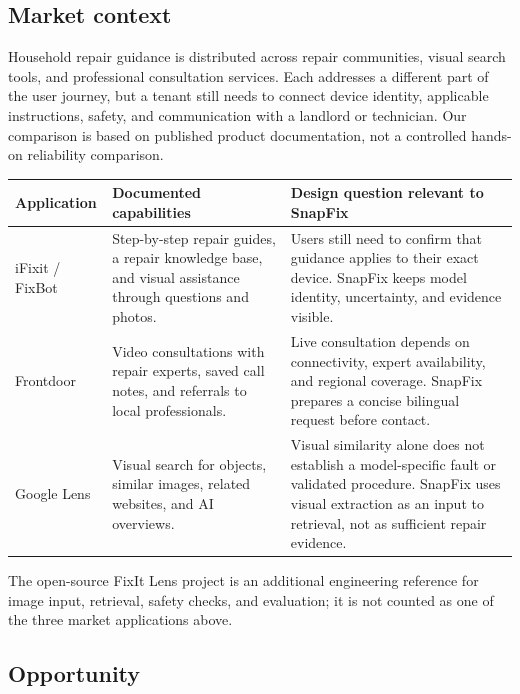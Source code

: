 \documentclass[10.5pt,a4paper]{article}
\begin{document}
\subsection{Market context}

Household repair guidance is distributed across repair communities, visual search tools, and professional consultation services. Each addresses a different part of the user journey, but a tenant still needs to connect device identity, applicable instructions, safety, and communication with a landlord or technician. Our comparison is based on published product documentation, not a controlled hands-on reliability comparison.

\begin{center}
\small
\begin{tabularx}{\textwidth}{p{29mm}X X}
\toprule
\textbf{Application} & \textbf{Documented capabilities} & \textbf{Design question relevant to SnapFix} \\
\midrule
iFixit / FixBot & Step-by-step repair guides, a repair knowledge base, and visual assistance through questions and photos. \cite{ifixit} & Users still need to confirm that guidance applies to their exact device. SnapFix keeps model identity, uncertainty, and evidence visible. \\
\addlinespace[3pt]
Frontdoor & Video consultations with repair experts, saved call notes, and referrals to local professionals. \cite{frontdoor} & Live consultation depends on connectivity, expert availability, and regional coverage. SnapFix prepares a concise bilingual request before contact. \\
\addlinespace[3pt]
Google Lens & Visual search for objects, similar images, related websites, and AI overviews. \cite{lens} & Visual similarity alone does not establish a model-specific fault or validated procedure. SnapFix uses visual extraction as an input to retrieval, not as sufficient repair evidence. \\
\bottomrule
\end{tabularx}
\end{center}

The open-source FixIt Lens project is an additional engineering reference for image input, retrieval, safety checks, and evaluation; it is not counted as one of the three market applications above. \cite{fixitlens}

\subsection{Opportunity}
\end{document}
